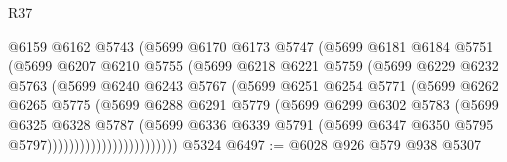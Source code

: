 \begin{lexlean}{R37}
\begin{coremodule}
                          @6159
                          @6162
                          @5743
                          (@5699
                            @6170
                            @6173
                            @5747
                            (@5699
                              @6181
                              @6184
                              @5751
                              (@5699
                                @6207
                                @6210
                                @5755
                                (@5699
                                  @6218
                                  @6221
                                  @5759
                                  (@5699
                                    @6229
                                    @6232
                                    @5763
                                    (@5699
                                      @6240
                                      @6243
                                      @5767
                                      (@5699
                                        @6251
                                        @6254
                                        @5771
                                        (@5699
                                          @6262
                                          @6265
                                          @5775
                                          (@5699
                                            @6288
                                            @6291
                                            @5779
                                            (@5699
                                              @6299
                                              @6302
                                              @5783
                                              (@5699
                                                @6325
                                                @6328
                                                @5787
                                                (@5699
                                                  @6336
                                                  @6339
                                                  @5791
                                                  (@5699
                                                    @6347
                                                    @6350
                                                    @5795
                                                    @5797))))))))))))))))))))))))
    @5324
@6497 := @6028 @926 @579 @938 @5307

\end{coremodule}
\end{lexlean}
